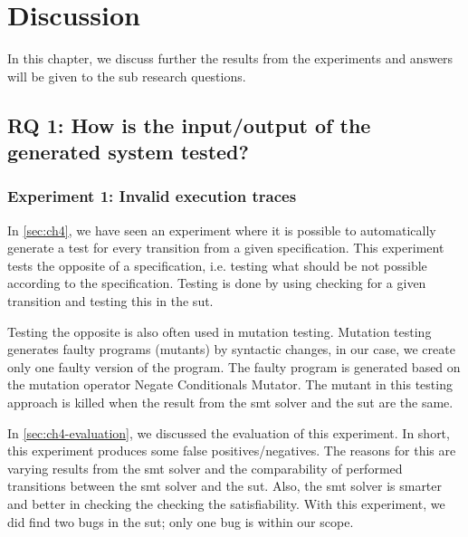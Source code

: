 \chapter{Discussion}\label{sec:ch6}

In this chapter, we discuss further the results from the experiments and answers
will be given to the sub research questions.

\section{RQ 1: How is the input/output of the generated system tested?}

\subsection{Experiment 1: Invalid execution traces}
In \autoref{sec:ch4}, we have seen an experiment where it is possible to automatically generate a test for every transition from a given specification. This experiment tests the opposite of a specification, i.e. testing what should be not possible according to the specification. Testing is done by using checking for a given transition and testing this in the \gls{sut}.

Testing the opposite is also often used in mutation testing. Mutation testing generates faulty programs (mutants) by syntactic changes, in our case, we create only one faulty version of the program. The faulty program is generated based on the mutation operator Negate Conditionals Mutator. The mutant in this testing approach is killed when the result from the \gls{smt} solver and the \gls{sut} are the same.

In \autoref{sec:ch4-evaluation}, we discussed the evaluation of this experiment. In short, this experiment produces some false positives/negatives. The reasons for this are varying results from the \gls{smt} solver and the comparability of performed transitions between the \gls{smt} solver and the \gls{sut}. Also, the \gls{smt} solver is smarter and better in checking the checking the satisfiability. With this experiment, we did find two bugs in the \gls{sut}; only one bug is within our scope.

